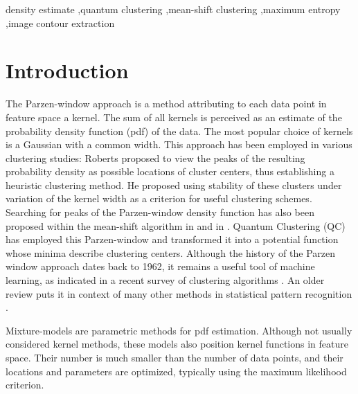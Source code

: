 \documentclass[preprint,12pt]{elsarticle}
\begin{document}
\begin{frontmatter}
\begin{abstract}
\end{abstract}

\begin{keyword}
density estimate \sep quantum clustering \sep mean-shift clustering \sep maximum entropy \sep image contour extraction


\end{keyword}

\end{frontmatter}





\section{Introduction}
\label{introduction}
The Parzen-window approach \cite{parzen1962estimation} is a method attributing to each data point in feature space a kernel. The sum of all kernels is perceived as an estimate of the probability density function (pdf) of the data. The most popular choice of kernels is a Gaussian with a common width. This approach has been employed in various clustering studies: Roberts \cite{roberts1997} proposed to view the peaks of the resulting probability density as possible locations of cluster centers, thus establishing a heuristic clustering method. He proposed using stability of these clusters under variation of the kernel width as a criterion for useful clustering schemes. Searching for peaks of the Parzen-window density function has also been proposed within the mean-shift algorithm in \cite{cheng1995} and in \cite{comaniciu2002}. Quantum Clustering (QC) \cite{horn2001} has employed this Parzen-window and transformed it into a potential function whose minima describe clustering centers. Although the history of the Parzen window approach dates back to 1962, it remains a useful tool of machine learning, as indicated in a recent survey of clustering algorithms \cite{xu2015comprehensive}. An older review puts it in context of many other methods in statistical pattern recognition \cite{jain2000statistical}.

Mixture-models \cite{titterington1985} are parametric methods for pdf estimation. Although not usually considered kernel methods, these models also position kernel functions in feature space. Their number is much smaller than the number of data points, and their locations and parameters are optimized, typically using the maximum likelihood criterion. 
\end{document}
